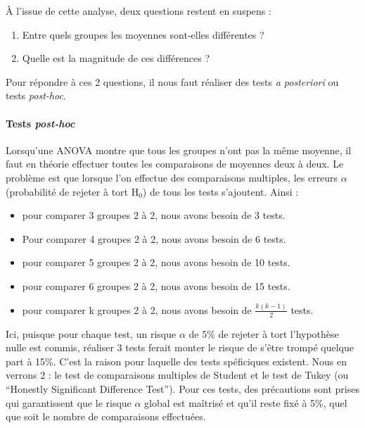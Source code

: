 \documentclass[a4paperpaper,]{article}
\providecommand{\tightlist}{%
  \setlength{\itemsep}{0pt}\setlength{\parskip}{0pt}}
\let\oldparagraph\paragraph
\renewcommand{\paragraph}[1]{\oldparagraph{#1}\mbox{}}
\begin{document}
À l'issue de cette analyse, deux questions restent en suspens :

\begin{enumerate}
\def\labelenumi{\arabic{enumi}.}
\tightlist
\item
  Entre quels groupes les moyennes sont-elles différentes ?
\item
  Quelle est la magnitude de ces différences ?
\end{enumerate}

Pour répondre à ces 2 questions, il nous faut réaliser des tests \emph{a posteriori} ou tests \emph{post-hoc}.

\hypertarget{tests-post-hoc}{%
\paragraph{\texorpdfstring{Tests \emph{post-hoc}}{Tests post-hoc}}\label{tests-post-hoc}}

Lorsqu'une ANOVA montre que tous les groupes n'ont pas la même moyenne, il faut en théorie effectuer toutes les comparaisons de moyennes deux à deux. Le problème est que lorsque l'on effectue des comparaisons multiples, les erreurs \(\alpha\) (probabilité de rejeter à tort H\(_0\)) de tous les tests s'ajoutent. Ainsi :

\begin{itemize}
\tightlist
\item
  pour comparer 3 groupes 2 à 2, nous avons besoin de 3 tests.
\item
  Pour comparer 4 groupes 2 à 2, nous avons besoin de 6 tests.
\item
  pour comparer 5 groupes 2 à 2, nous avons besoin de 10 tests.
\item
  pour comparer 6 groupes 2 à 2, nous avons besoin de 15 tests.
\item
  pour comparer k groupes 2 à 2, nous avons besoin de \(\frac{k(k-1)}{2}\) tests.
\end{itemize}

Ici, puisque pour chaque test, un risque \(\alpha\) de 5\% de rejeter à tort l'hypothèse nulle est commis, réaliser 3 tests ferait monter le risque de s'être trompé quelque part à 15\%. C'est la raison pour laquelle des tests spéficiques existent. Nous en verrons 2 : le test de comparaisons multiples de Student et le test de Tukey (ou ``Honestly Significant Difference Test''). Pour ces tests, des précautions sont prises qui garantissent que le risque \(\alpha\) global est maîtrisé et qu'il reste fixé à 5\%, quel que soit le nombre de comparaisons effectuées.
\end{document}
